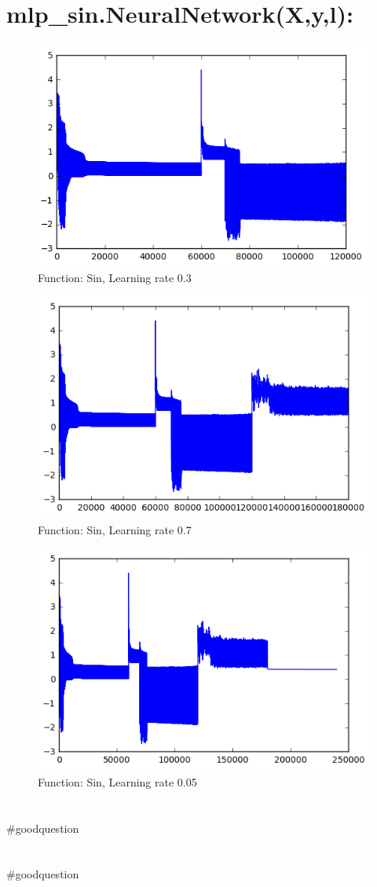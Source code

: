 \documentclass[11pt]{article}
\newcommand{\exercise}{\section{}}
\begin{document}
\section*{mlp\_sin.NeuralNetwork(X,y,l):}
\begin{figure}[H]
	\centering
	\includegraphics[width=0.7\linewidth]{sin_lr03}
	\caption{Function: Sin, Learning rate 0.3}
	\label{fig:sinlr03}
\end{figure}
\begin{figure}[H]
	\centering
	\includegraphics[width=0.7\linewidth]{sin_lr07}
	\caption{Function: Sin, Learning rate 0.7}
	\label{fig:sinlr07}
\end{figure}
\begin{figure}[H]
	\centering
	\includegraphics[width=0.7\linewidth]{sin_lr005}
	\caption{Function: Sin, Learning rate 0.05}
	\label{fig:sinlr005}
\end{figure}

\exercise
\#goodquestion

\exercise
\#goodquestion
\end{document}
